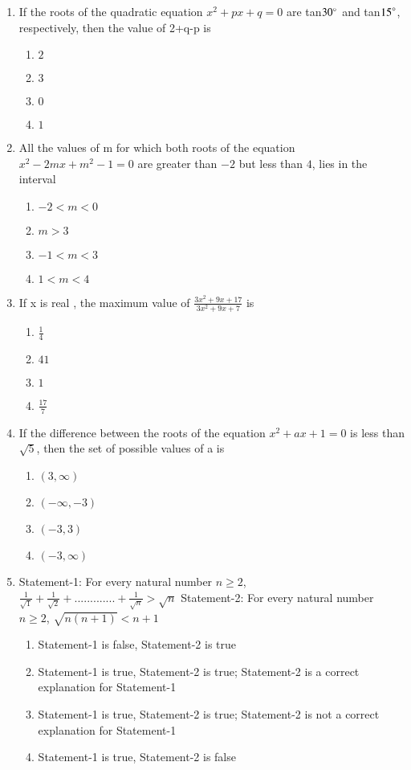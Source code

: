 \begin{enumerate}[label=\arabic*.,ref=\thesubsection.\theenumi]
\item If the roots of the quadratic equation $x^2+px+q=0$ are tan$30\degree$ and tan${15}\degree$, respectively, then the value of 2+q-p is
\begin{enumerate}
\item $2$
\item $3$
\item $0$
\item $1$ 
\end{enumerate}

\item All the values of m for which both roots of the equation $x^2-2mx+m^2-1=0$ are greater than $-2$ but less than $4$, lies in the interval
\begin{enumerate}
\item $-2<m<0$
\item $m>3$
\item $-1<m<3$
\item $1<m<4$ 
\end{enumerate}

\item If x is real , the maximum value of $\frac{3x^2+9x+17}{3x^2+9x+7}$ is
\begin{enumerate}
\item $\frac{1}{4}$
\item $41$
\item $1$
\item $\frac{17}{7}$ 
\end{enumerate}

\item If the difference between the roots of the equation $x^2+ax+1=0$ is less than $\sqrt5$, then the set of possible values of a is
\begin{enumerate}
\item $(3,\infty)$
\item $(-\infty,-3)$
\item $(-3,3)$
\item $(-3,\infty)$
\end{enumerate}

\item Statement-1: For every natural number $n\geq{2}$,
$\frac{1}{\sqrt1}+\frac{1}{\sqrt2}+.............+\frac{1}{\sqrt{n}}>\sqrt{n}$ 
Statement-2: For every natural number $n\geq{2}$,
$\sqrt{n(n+1)}<n+1$
\begin{enumerate}
\item Statement-1 is false, Statement-2 is true
\item Statement-1 is true, Statement-2 is true; Statement-2 is a correct explanation for Statement-1
\item Statement-1 is true, Statement-2 is true; Statement-2 is not a correct explanation for Statement-1
\item Statement-1 is true, Statement-2 is false 
\end{enumerate}


\end{enumerate}
